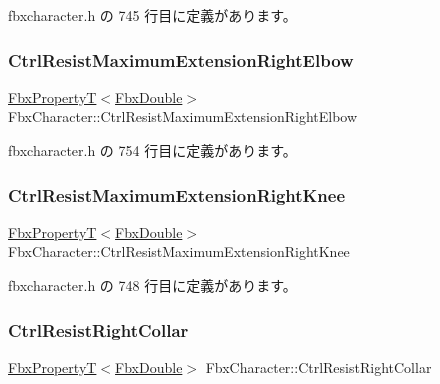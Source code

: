  fbxcharacter.\+h の 745 行目に定義があります。

\mbox{\label{class_fbx_character_a6497c69374b1af8f0d52095d110afda5}} 
\subsubsection{\texorpdfstring{Ctrl\+Resist\+Maximum\+Extension\+Right\+Elbow}{CtrlResistMaximumExtensionRightElbow}}
{\footnotesize\ttfamily \hyperlink{class_fbx_property_t}{Fbx\+PropertyT}$<$\hyperlink{fbxtypes_8h_a171e72a1c46fc15c1a6c9c31948c1c5b}{Fbx\+Double}$>$ Fbx\+Character\+::\+Ctrl\+Resist\+Maximum\+Extension\+Right\+Elbow}



 fbxcharacter.\+h の 754 行目に定義があります。

\mbox{\label{class_fbx_character_a3a1f82f2e0f5dc821cc754f6eec3c364}} 
\subsubsection{\texorpdfstring{Ctrl\+Resist\+Maximum\+Extension\+Right\+Knee}{CtrlResistMaximumExtensionRightKnee}}
{\footnotesize\ttfamily \hyperlink{class_fbx_property_t}{Fbx\+PropertyT}$<$\hyperlink{fbxtypes_8h_a171e72a1c46fc15c1a6c9c31948c1c5b}{Fbx\+Double}$>$ Fbx\+Character\+::\+Ctrl\+Resist\+Maximum\+Extension\+Right\+Knee}



 fbxcharacter.\+h の 748 行目に定義があります。

\mbox{\label{class_fbx_character_a2b946a7f3b93a64587869ef4e3de0010}} 
\subsubsection{\texorpdfstring{Ctrl\+Resist\+Right\+Collar}{CtrlResistRightCollar}}
{\footnotesize\ttfamily \hyperlink{class_fbx_property_t}{Fbx\+PropertyT}$<$\hyperlink{fbxtypes_8h_a171e72a1c46fc15c1a6c9c31948c1c5b}{Fbx\+Double}$>$ Fbx\+Character\+::\+Ctrl\+Resist\+Right\+Collar}



